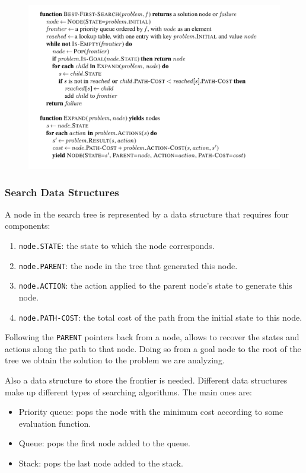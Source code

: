 \documentclass{article}
\newcommand{\code}{\lstinline}
\begin{document}
\begin{figure}[h]
    \centering
    \includegraphics[width=1\linewidth]{algorithms/Best First Search.png}
    \label{fig:best_first_search_algorithm}
\end{figure}

\subsubsection{Search Data Structures}
A node in the search tree is represented by a data structure that requires four components:
\begin{enumerate}
    \item \code{node.STATE}: the state to which the node corresponds.
    \item \code{node.PARENT}: the node in the tree that generated this node.
    \item \code{node.ACTION}: the action applied to the parent node's state to generate this node.
    \item \code{node.PATH-COST}: the total cost of the path from the initial state to this node.
\end{enumerate}

Following the \code{PARENT} pointers back from a node, allows to recover the states and actions along the path to that node. Doing so from a goal node to the root of the tree we obtain the solution to the problem we are analyzing. 

Also a data structure to store the frontier is needed. Different data structures make up different types of searching algorithms. The main ones are:
\begin{itemize}
    \item Priority queue: pops the node with the minimum cost according to some evaluation function.
    \item Queue: pops the first node added to the queue.
    \item Stack: pops the last node added to the stack.
\end{itemize}
\end{document}
